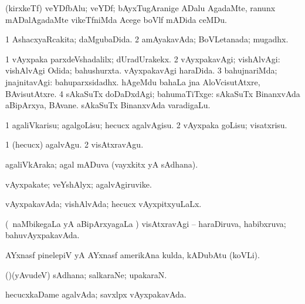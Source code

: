 {{{{{{\bentry
{}
 \gl{\nA}\bmng
(kirxkeTf) veYDfbAlu; veYDf; bAyxTugAranige ADalu AgadaMte, ranunx mADalAgadaMte vikeTfniMda Acege boVlf mADida ceMDu. 
\emng
\eentry

\bentry 
{}
  \gl{\gu}\bmng
\bnum
\num{1} AshacxyaRcakita; daMgubaDida. 
\num{2} amAyakavAda; BoVLetanada; mugadhx. 
\enum
\emng
\eentry

\bentry
{}
  \gl{\kirxvi}\bmng
\bnum
\num{1} vAyxpaka parxdeVshadalilx; dUradUrakekx. 
\num{2} vAyxpakavAgi; vishAlvAgi:  vishAlvAgi Odida; bahushurxta.  vAyxpakavAgi haraDida. 
\num{3} bahujnariMda; jnajnitavAgi:  bahuparxsidadhx.  hAgeMdu bahaLa jna AloVcisutAtxre, BAvisutAtxre. 
\num{4} sAkaSuTx doDaDxdAgi; bahumaTiTxge:  sAkaSuTx BinanxvAda aBipArxya, BAvane.  sAkaSuTx BinanxvAda varadigaLu. 
\enum
\emng
\eentry

\bentry
{} 
\gl{\sakirx}
\expl{}
\bmng
\bnum
\num{1} agaliVkarisu; agalgoLisu; hecucx agalvAgisu. 
\num{2} vAyxpaka goLisu; visatxrisu. 
\enum
\emng

\noindent
\gl{\akirx}
\bmng
\bnum
\num{1} (hecucx) agalvAgu. 
\num{2} visAtxravAgu. 
\enum
\emng
\eentry

\bentry
{} 
\gl{\nA}
\expl{}
\bmng
agaliVkAraka; agal mADuva (vayxkitx yA sAdhana). 
\emng
\eentry

\bentry
{}
  \gl{\nA}\bmng
vAyxpakate; veYshAlyx; agalvAgiruvike. 
\emng
\eentry

\bentry
{}
  \gl{\gu}\bmng
vAyxpakavAda; vishAlvAda; hecucx vAyxpitxyuLaLx. 
\emng
\eentry

\bentry
{}
  \gl{\gu}\bmng
(\kanmu\ naMbikegaLa yA aBipArxyagaLa \vi) visAtxravAgi -- haraDiruva, habibxruva; bahuvAyxpakavAda. 
\emng
\eentry

\bentry
{}
  \gl{\nA}\bmng
AYxnasf pinelepiV yA AYxnasf amerikAna kulda, kADubAtu (koVLi). 
\emng
\eentry

\bentry
{}
  \gl{\nA}\bmng
(\AmA)(yAvudeV) sAdhana; salkaraNe; upakaraN. 
\emng
\eentry

\bentry
{} 
\gl{\gu}
\expl{}
\bmng
hecucxkaDame agalvAda; savxlpx vAyxpakavAda. 
\emng
\eentry

}}}}}}
